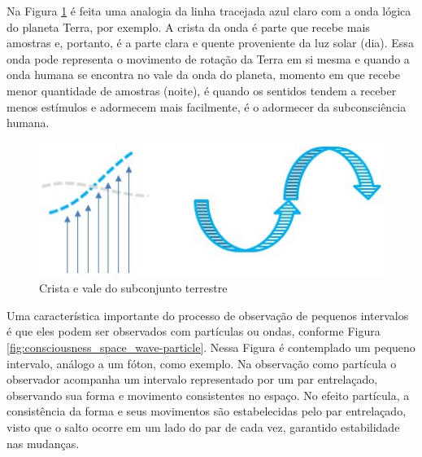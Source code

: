 Na Figura \ref{fig:consciousness_amplitude_crest_valley} é feita uma analogia da linha tracejada azul claro com a onda lógica do planeta Terra, por exemplo. A crista da onda é parte que recebe mais amostras e, portanto, é a parte clara e quente proveniente da luz solar (dia). Essa onda pode representa o movimento de rotação da Terra em si mesma e quando a onda humana se encontra no vale da onda do planeta, momento em que recebe menor quantidade de amostras (noite), é quando os sentidos tendem a receber menos estímulos e adormecem mais facilmente, é o adormecer da subconsciência humana.
	\begin{figure}[H]
	\caption{Crista e vale do subconjunto terrestre}
	\label{fig:consciousness_amplitude_crest_valley}
	\centering
	\includegraphics[scale=.6]{sections/images/consciousness_amplitude_crest_valley.jpg}
	\end{figure}

Uma característica importante do processo de observação de pequenos intervalos é que eles podem ser observados com partículas ou ondas, conforme Figura \ref{fig:consciousness_space_wave-particle}. Nessa Figura é contemplado um pequeno intervalo, análogo a um fóton, como exemplo. Na observação como partícula o observador acompanha um intervalo representado por um par entrelaçado, observando sua forma e movimento consistentes no espaço. No efeito partícula, a consistência da forma e seus movimentos são estabelecidas pelo par entrelaçado, visto que o salto ocorre em um lado do par de cada vez, garantido estabilidade nas mudanças.

